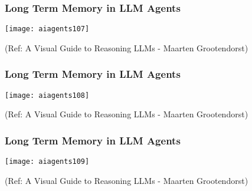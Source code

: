 \begin{frame}[fragile]\frametitle{Long Term Memory in LLM Agents}



        \begin{center}
        \texttt{[image: aiagents107]}

		
        {\tiny (Ref: A Visual Guide to Reasoning LLMs - Maarten Grootendorst)}
        \end{center}

\end{frame}

\begin{frame}[fragile]\frametitle{Long Term Memory in LLM Agents}



        \begin{center}
        \texttt{[image: aiagents108]}

		
        {\tiny (Ref: A Visual Guide to Reasoning LLMs - Maarten Grootendorst)}
        \end{center}

\end{frame}

\begin{frame}[fragile]\frametitle{Long Term Memory in LLM Agents}



        \begin{center}
        \texttt{[image: aiagents109]}

		
        {\tiny (Ref: A Visual Guide to Reasoning LLMs - Maarten Grootendorst)}
        \end{center}

\end{frame}

